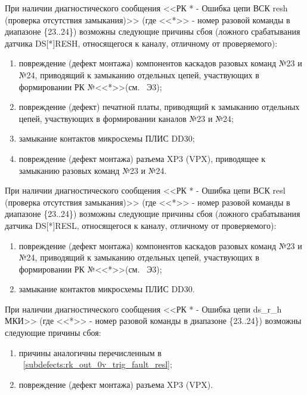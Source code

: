 \begin{sloppypar}
    \subpoint При наличии диагностического сообщения <<РК * - Ошибка цепи ВСК resh (проверка отсутствия замыкания)>> 
	      (где <<*>> - номер разовой команды в диапазоне \{23..24\}) возможны следующие причины сбоя (ложного срабатывания датчика DS[*]RESH, относящегося к каналу, отличному от проверяемого):
	  \label{subdefects:rk_out_0v_trig_fault_resh_cross}	  
	  \begin{enumerate}
	    \item повреждение (дефект монтажа) компонентов каскадов разовых команд №23 и №24, 
		  приводящий к замыканию отдельных цепей, участвующих в формировании РК №<<*>>(см. \DocProductSignature~Э3); 
	    \item повреждение (дефект) печатной платы, приводящий к замыканию отдельных цепей, участвующих в формировании каналов №23 и №24;
	    \item замыкание контактов микросхемы ПЛИС DD30;
	    \item повреждение (дефект монтажа) разъема XP3 (VPX), приводящее к замыканию разовых команд №23 и №24.
	  \end{enumerate}
      
    \subpoint При наличии диагностического сообщения <<РК * - Ошибка цепи ВСК resl (проверка отсутствия замыкания)>> 
	      (где <<*>> - номер разовой команды в диапазоне \{23..24\}) возможны следующие причины сбоя (ложного срабатывания датчика DS[*]RESL, относящегося к каналу, отличному от проверяемого):
	  \label{subdefects:rk_out_0v_trig_fault_resl_cross}
	  \begin{enumerate}	     
	    \item повреждение (дефект монтажа) компонентов каскадов разовых команд №23 и №24, 
		  приводящий к замыканию отдельных цепей, участвующих в формировании РК №<<*>>(см. \DocProductSignature~Э3);
	    \item замыкание контактов микросхемы ПЛИС DD30.
	  \end{enumerate}
    
    \subpoint При наличии диагностического сообщения <<РК * - Ошибка цепи ds\_r\_h МКИ>> 
	      (где <<*>> - номер разовой команды в диапазоне \{23..24\}) возможны следующие причины сбоя:    
	  \begin{enumerate}
	    \item причины аналогичны перечисленным в ~\ref{subdefects:rk_out_0v_trig_fault_resl};%
	    \item повреждение (дефект монтажа) разъема XP3 (VPX).
	  \end{enumerate}
    

\end{sloppypar}
